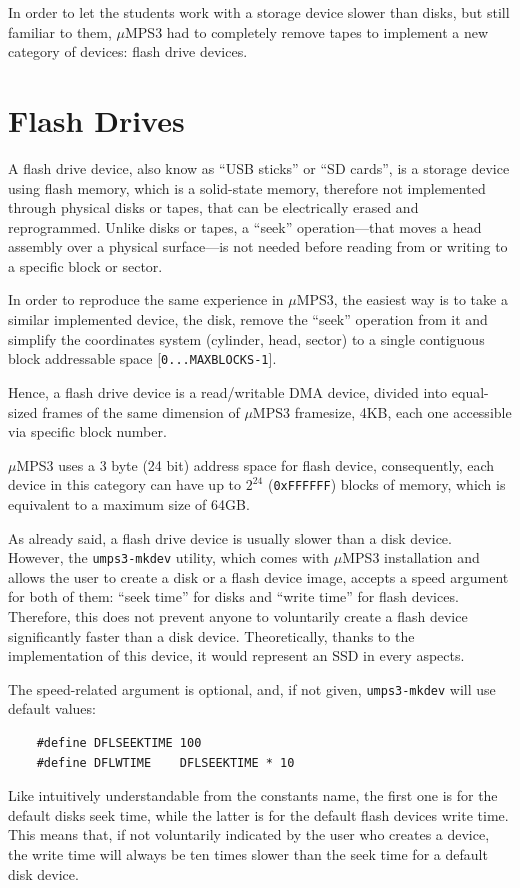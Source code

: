 \documentclass[12pt,a4paper,openright,twoside]{report}
\begin{document}
In order to let the students work with a storage device slower than disks, but still familiar to them, $\mu$MPS3 had to completely remove tapes to implement a new category of devices: flash drive devices.

\section{Flash Drives}
A flash drive device, also know as ``USB sticks'' or ``SD cards'', is a storage device using flash memory, which is a solid-state memory, therefore not implemented through physical disks or tapes, that can be electrically erased and reprogrammed.
Unlike disks or tapes, a ``seek'' operation---that moves a head assembly over a physical surface---is not needed before reading from or writing to a specific block or sector.

In order to reproduce the same experience in $\mu$MPS3, the easiest way is to take a similar implemented device, the disk, remove the ``seek'' operation from it and simplify the coordinates system (cylinder, head, sector) to a single contiguous block addressable space [\texttt{0...MAXBLOCKS-1}].

Hence, a flash drive device is a read/writable DMA device, divided into equal-sized frames of the same dimension of $\mu$MPS3 framesize, 4KB, each one accessible via specific block number.

$\mu$MPS3 uses a 3 byte (24 bit) address space for flash device, consequently, each device in this category can have up to $2^{24}$ (\texttt{0xFFFFFF}) blocks of memory, which is equivalent to a maximum size of 64GB.

As already said, a flash drive device is usually slower than a disk device.
However, the \texttt{umps3-mkdev} utility, which comes with $\mu$MPS3 installation and allows the user to create a disk or a flash device image, accepts a speed argument for both of them: ``seek time'' for disks and ``write time'' for flash devices.
Therefore, this does not prevent anyone to voluntarily create a flash device significantly faster than a disk device.
Theoretically, thanks to the implementation of this device, it would represent an SSD in every aspects.

The speed-related argument is optional, and, if not given, \texttt{umps3-mkdev} will use default values:
\begin{verbatim}
	#define DFLSEEKTIME 100
	#define DFLWTIME    DFLSEEKTIME * 10
	\end{verbatim}
Like intuitively understandable from the constants name, the first one is for the default disks seek time, while the latter is for the default flash devices write time.
This means that, if not voluntarily indicated by the user who creates a device, the write time will always be ten times slower than the seek time for a default disk device.
\end{document}
